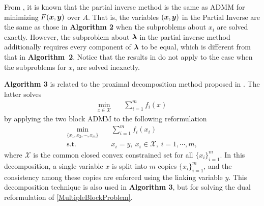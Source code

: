 \documentclass{mcom-l}
\theoremstyle{definition}
\theoremstyle{remark}
\numberwithin{equation}{section}
\begin{document}
{From \cite[Algorithm 2]{Spingarn1985}, it is known that the partial inverse method is the same as ADMM for minimizing $F({{\mbox{\boldmath $x$}}},{{\mbox{\boldmath $y$}}})$ over $A$. That is, the variables $({{\mbox{\boldmath $x$}}},{{\mbox{\boldmath $y$}}})$ in the {{Partial Inverse}} are the same as those in {\bf{Algorithm 2}} when the subproblems about $x_i$ are solved exactly.} However, the subproblem about ${{\mbox{\boldmath $\lambda$}}}$ in the partial inverse method additionally requires every component of ${{\mbox{\boldmath $\lambda$}}}$ to be equal, which is different from that in {\bf{Algorithm~2}}. Notice that the results in \cite{Spingarn1985} do not apply to the case when the subproblems for $x_i$ are solved inexactly.

{\bf Algorithm 3} is related to the proximal decomposition method proposed in \cite{CombettesPesquet2008}. The latter solves
\begin{align}\label{ProximalDecomposition}
\min_{x\in {\mathcal{X}}}& \quad \sum_{i=1}^m f_i (x)
\end{align}
by applying the  two block ADMM to the following reformulation
\begin{align}\label{ProximalDecomposition}
\min_{\{ x_1,x_2,\cdots,x_m \}}& \quad \sum_{i=1}^m f_i (x_i)\\
\mbox{s.t.}&\quad  x_i=y ,\  x_i\in {\mathcal{X}}, \ i=1,\cdots,m,
\end{align}
where ${\mathcal{X}}$ is the common closed convex constrained set for all $\{x_i\}_{i=1}^{m}$. In this decomposition, a single variable $x$ is split into $m$ copies $\{x_i\}_{i=1}^{m}$, and the consistency among these copies are enforced using the linking variable $y$. This decomposition technique is also used in {\bf Algorithm 3}, but for solving the dual reformulation of \eqref{MultipleBlockProblem}.
\end{document}
